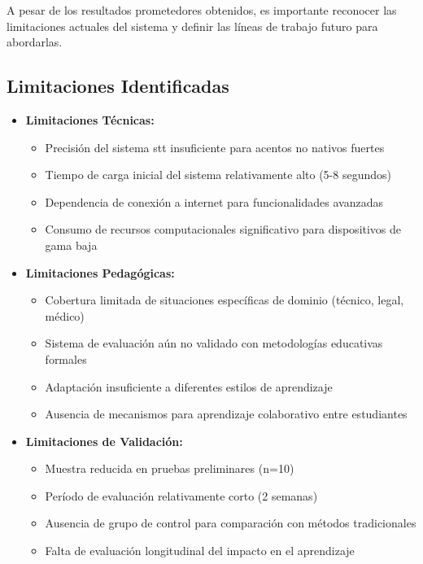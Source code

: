 A pesar de los resultados prometedores obtenidos, es importante reconocer las limitaciones actuales del sistema y definir las líneas de trabajo futuro para abordarlas.

\subsection{Limitaciones Identificadas}
\label{subsec:limitaciones-identificadas}

\begin{itemize}
    \item \textbf{Limitaciones Técnicas:}
    \begin{itemize}
        \item Precisión del sistema \gls{stt} insuficiente para acentos no nativos fuertes
        \item Tiempo de carga inicial del sistema relativamente alto (5-8 segundos)
        \item Dependencia de conexión a internet para funcionalidades avanzadas
        \item Consumo de recursos computacionales significativo para dispositivos de gama baja
    \end{itemize}

    \item \textbf{Limitaciones Pedagógicas:}
    \begin{itemize}
        \item Cobertura limitada de situaciones específicas de dominio (técnico, legal, médico)
        \item Sistema de evaluación aún no validado con metodologías educativas formales
        \item Adaptación insuficiente a diferentes estilos de aprendizaje
        \item Ausencia de mecanismos para aprendizaje colaborativo entre estudiantes
    \end{itemize}

    \item \textbf{Limitaciones de Validación:}
    \begin{itemize}
        \item Muestra reducida en pruebas preliminares (n=10)
        \item Período de evaluación relativamente corto (2 semanas)
        \item Ausencia de grupo de control para comparación con métodos tradicionales
        \item Falta de evaluación longitudinal del impacto en el aprendizaje
    \end{itemize}
\end{itemize}


